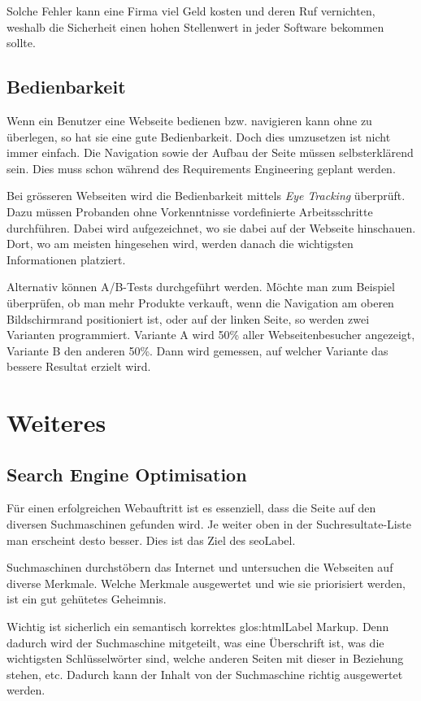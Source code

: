 Solche Fehler kann eine Firma viel Geld kosten und deren Ruf vernichten, weshalb die Sicherheit einen hohen Stellenwert in jeder Software bekommen sollte.

\subsection{Bedienbarkeit}
Wenn ein Benutzer eine Webseite bedienen bzw. navigieren kann ohne zu überlegen, so hat sie eine gute Bedienbarkeit. Doch dies umzusetzen ist nicht immer einfach. Die Navigation sowie der Aufbau der Seite müssen selbsterklärend sein. Dies muss schon während des Requirements Engineering geplant werden.

Bei grösseren Webseiten wird die Bedienbarkeit mittels \textit{Eye Tracking} überprüft. Dazu müssen Probanden ohne Vorkenntnisse vordefinierte Arbeitsschritte durchführen. Dabei wird aufgezeichnet, wo sie dabei auf der Webseite hinschauen. Dort, wo am meisten hingesehen wird, werden danach die wichtigsten Informationen platziert.

Alternativ können A/B-Tests durchgeführt werden. Möchte man zum Beispiel überprüfen, ob man mehr Produkte verkauft, wenn die Navigation am oberen Bildschirmrand positioniert ist, oder auf der linken Seite, so werden zwei Varianten programmiert. Variante A wird 50\% aller Webseitenbesucher angezeigt, Variante B den anderen 50\%. Dann wird gemessen, auf welcher Variante das bessere Resultat erzielt wird.

\section{Weiteres}
\subsection{Search Engine Optimisation}
Für einen erfolgreichen Webauftritt ist es essenziell, dass die Seite auf den diversen Suchmaschinen gefunden wird. Je weiter oben in der Suchresultate-Liste man erscheint desto besser. Dies ist das Ziel des  \gls{seoLabel}.

Suchmaschinen durchstöbern das Internet und untersuchen die Webseiten auf diverse Merkmale. Welche Merkmale ausgewertet und wie sie priorisiert werden, ist ein gut gehütetes Geheimnis.

Wichtig ist sicherlich ein semantisch korrektes \Gls{glos:htmlLabel} Markup. Denn dadurch wird der Suchmaschine mitgeteilt, was eine Überschrift ist, was die wichtigsten Schlüsselwörter sind, welche anderen Seiten mit dieser in Beziehung stehen, etc. Dadurch kann der Inhalt von der Suchmaschine richtig ausgewertet werden.

